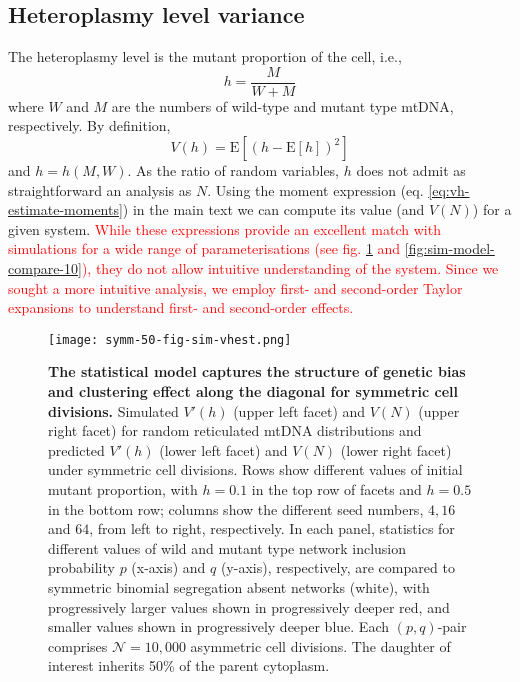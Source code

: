 \documentclass{article}
\begin{document}
\begin{appendices}
\section{Heteroplasmy level variance}\label{app:vh-est}
The heteroplasmy level is the mutant proportion of the cell, i.e.,
\begin{equation*}
    h=\frac{M}{W+M}
\end{equation*}
where $W$ and $M$ are the numbers of wild-type and mutant type mtDNA, respectively. By definition,
\begin{equation*}\label{eq:app-vhest}
    V(h)=\mathrm{E}\left[(h-\mathrm{E}[h])^2\right]
\end{equation*}
and $h=h(M,W)$. As the ratio of random variables, $h$ does not admit as straightforward an analysis as $N$. Using the moment expression (eq. \ref{eq:vh-estimate-moments}) in the main text we can compute its value (and $V(N)$) for a given system. \textcolor{red}{While these expressions provide an excellent match with simulations for a wide range of parameterisations (see fig. \ref{fig:app-vhestimate-symm} and \ref{fig:sim-model-compare-10}), they do not allow intuitive understanding of the system. Since we sought a more intuitive analysis, we employ first- and second-order Taylor expansions to understand first- and second-order effects.}%


\begin{figure}
\centering
\texttt{[image: symm-50-fig-sim-vhest.png]}
\caption{\textbf{The statistical model captures the structure of genetic bias and clustering effect along the diagonal for symmetric cell divisions.} Simulated $V'(h)$ (upper left facet) and $V(N)$ (upper right facet) for random reticulated mtDNA distributions and predicted $V'(h)$ (lower left facet) and $V(N)$ (lower right facet) under symmetric cell divisions. Rows show different values of initial mutant proportion, with $h=0.1$ in the top row of facets and $h=0.5$ in the bottom row; columns show the different seed numbers, $4, 16$ and $64$, from left to right, respectively. In each panel, statistics for different values of wild and mutant type network inclusion probability $p$ (x-axis) and $q$ (y-axis), respectively, are compared to symmetric binomial segregation absent networks (white), with progressively larger values shown in progressively deeper red, and smaller values shown in progressively deeper blue. Each $(p,q)$-pair comprises $\mathcal{N}=10,000$ asymmetric cell divisions. The daughter of interest inherits 50\% of the parent cytoplasm.}\label{fig:app-vhestimate-symm}
\end{figure}


\end{appendices}
\end{document}
